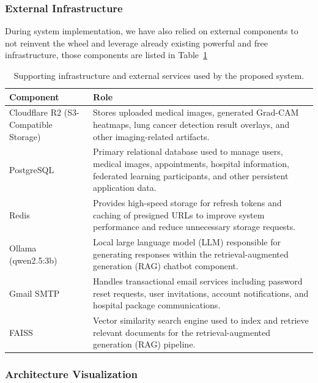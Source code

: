 \subsubsection{External Infrastructure}
During system implementation, we  have also relied on external components to not reinvent the wheel  and leverage already existing powerful and free infrastructure, those components are listed in Table~\ref{tab:supporting_infrastructure}
\begin{table}[htbp]
	\centering
	\caption{Supporting infrastructure and external services used by the proposed system.}
	\label{tab:supporting_infrastructure}
	\begin{tabular}{|p{4.5cm}|p{10cm}|}
		\hline
		\textbf{Component} & \textbf{Role} \\
		\hline
		
		Cloudflare R2 (S3-Compatible Storage) &
		Stores uploaded medical images, generated Grad-CAM heatmaps, lung cancer detection result overlays, and other imaging-related artifacts. \\
		\hline
		
		PostgreSQL &
		Primary relational database used to manage users, medical images, appointments, hospital information, federated learning participants, and other persistent application data. \\
		\hline
		
		Redis &
		Provides high-speed storage for refresh tokens and caching of presigned URLs to improve system performance and reduce unnecessary storage requests. \\
		\hline
		
		Ollama (qwen2.5:3b) &
		Local large language model (LLM) responsible for generating responses within the retrieval-augmented generation (RAG) chatbot component. \\
		\hline
		
		Gmail SMTP &
		Handles transactional email services including password reset requests, user invitations, account notifications, and hospital package communications. \\
		\hline
		
		FAISS &
		Vector similarity search engine used to index and retrieve relevant documents for the retrieval-augmented generation (RAG) pipeline. \\
		\hline
		
	\end{tabular}
\end{table}

\subsubsection{Architecture Visualization}

